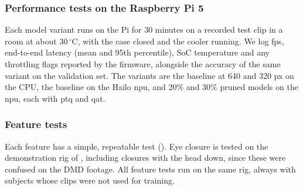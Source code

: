 \subsubsection{Performance tests on the Raspberry Pi 5}

Each model variant runs on the Pi for 30 minutes on a recorded test clip in a room at about 30\,$^\circ$C, with the case closed and the cooler running. We log \gls{fps}, end-to-end latency (mean and 95th percentile), SoC temperature and any throttling flags reported by the firmware, alongside the accuracy of the same variant on the validation set. The variants are the baseline at 640 and 320 px on the CPU, the baseline on the Hailo \gls{npu}, and 20\% and 30\% pruned models on the \gls{npu}, each with \gls{ptq} and \gls{qat}.


\subsubsection{Feature tests}

Each feature has a simple, repeatable test (). Eye closure is tested on the demonstration rig of , including closures with the head down, since these were confused on the DMD footage. All feature tests run on the same rig, always with subjects whose clips were not used for training.

